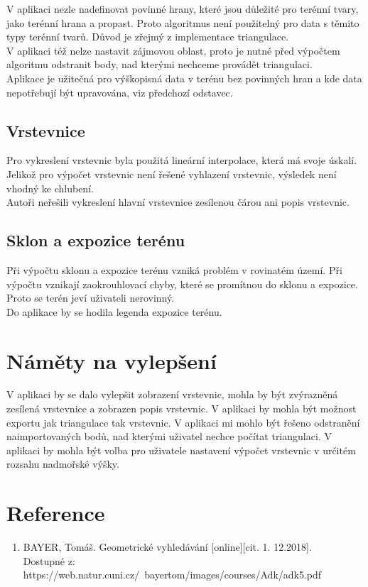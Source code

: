 \documentclass[a4paper, 12pt]{article}
\begin{document}
V aplikaci nezle nadefinovat povinné hrany, které jsou důležité pro terénní tvary, jako terénní hrana a propast. Proto algoritmus není použitelný pro data s těmito typy terénní tvarů. Důvod je zřejmý z implementace triangulace.\\

V aplikaci též nelze nastavit zájmovou oblast, proto je nutné před výpočtem algoritmu odstranit body, nad kterými nechceme provádět triangulaci.\\

Aplikace je užitečná pro výškopisná data v terénu bez povinných hran a kde data nepotřebují být upravována, viz předchozí odstavec. \\

\subsection{Vrstevnice}
Pro vykreslení vrstevnic byla použitá lineární interpolace, která má svoje úskalí. Jelikož pro výpočet vrstevnic není řešené vyhlazení vrstevnic, výsledek není vhodný ke chlubení.\\

Autoři neřešili vykreslení hlavní vrstevnice zesílenou čárou ani popis vrstevnic. \\

\subsection{Sklon a expozice terénu}
Při výpočtu sklonu a expozice terénu vzniká problém v rovinatém území. Při výpočtu vznikají zaokrouhlovací chyby, které se promítnou do sklonu a expozice. Proto se terén jeví uživateli nerovinný.\\

Do aplikace by se hodila legenda expozice terénu.\\

\section{Náměty na vylepšení}
V aplikaci by se dalo vylepšit zobrazení vrstevnic, mohla by být zvýrazněná zesílená vrstevnice a zobrazen popis vrstevnic. 
V aplikaci by mohla být možnost exportu jak triangulace tak vrstevnic. 
V aplikaci mi mohlo být řešeno odstranění naimportovaných bodů, nad kterými uživatel nechce počítat triangulaci. 
V aplikaci by mohla být volba pro uživatele nastavení výpočet vrstevnic v určitém rozsahu nadmořské výšky.\\


\clearpage
\section{Reference}

\begin{enumerate}
\item  BAYER, Tomáš. Geometrické vyhledávání [online][cit. 1. 12.2018]. \\
Dostupné z: https://web.natur.cuni.cz/~bayertom/images/courses/Adk/adk5.pdf  \\




\end{enumerate}
\end{document}
